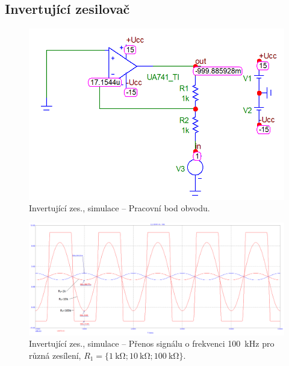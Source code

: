 \documentclass{protokol}
\begin{document}
\subsection{Invertující zesilovač}	
	\begin{figure}[h!]
		\centering
		\includegraphics[width=\textwidth]{numerika/Inverting/1_dc_prac_bod.png}
		\centering
		\caption{Invertující zes., simulace -- Pracovní bod obvodu.}
		\label{fig:i-s-prac_bod}
	\end{figure}
	
	\begin{figure}[h!]
		\centering
		\includegraphics[width=\textwidth]{numerika/Inverting/2_transient.png}
		\centering
		\caption{Invertující zes., simulace -- Přenos signálu o frekvenci \qty{100}{\kilo\hertz} pro různá zesílení, $ R_{1}= \{\SI{1}{\kilo\ohm};\SI{10}{\kilo\ohm};\SI{100}{\kilo\ohm}\} $.}
		\label{fig:i-s-prenos}
	\end{figure}
\end{document}
